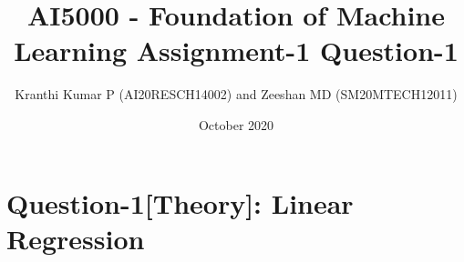 \documentclass[12pt]{article}
\begin{document}
     \def\rightbox#1{\makebox[0in][r]{#1}}
     \def\centbox#1{\makebox[0in]{#1}}
     \def\topbox#1{\raisebox{-\baselineskip}[0in][0in]{#1}}
     \def\midbox#1{\raisebox{-0.5\baselineskip}[0in][0in]{#1}}
\vspace{3cm}
\title{AI5000 - Foundation of Machine Learning Assignment-1 Question-1}
\author{Kranthi Kumar P (AI20RESCH14002) and Zeeshan MD (SM20MTECH12011)}
\date{October 2020}
\maketitle
\newpage
\bigskip
\renewcommand{\thefigure}{\theenumi}
\renewcommand{\thetable}{\theenumi}

%
\section*{Question-1[Theory]: Linear Regression}
\end{document}

